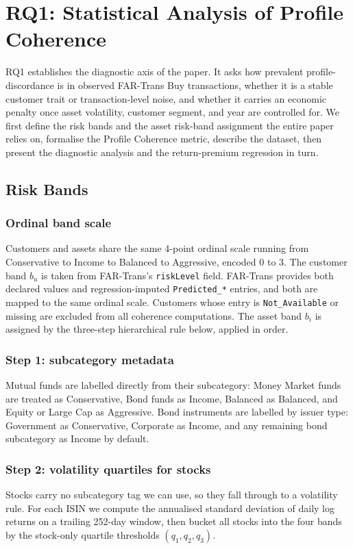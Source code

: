\section{RQ1: Statistical Analysis of Profile Coherence}
\label{sec:rq1}

RQ1 establishes the diagnostic axis of the paper. It asks how prevalent profile-discordance is in observed FAR-Trans Buy transactions, whether it is a stable customer trait or transaction-level noise, and whether it carries an economic penalty once asset volatility, customer segment, and year are controlled for. We first define the risk bands and the asset risk-band assignment the entire paper relies on, formalise the Profile Coherence metric, describe the dataset, then present the diagnostic analysis and the return-premium regression in turn.

\subsection{Risk Bands}
\label{sec:setup:bandassignment}

\subsubsection{Ordinal band scale}
Customers and assets share the same 4-point ordinal scale running from Conservative to Income to Balanced to Aggressive, encoded 0 to 3. The customer band $b_u$ is taken from FAR-Trans's \texttt{riskLevel} field. FAR-Trans provides both declared values and regression-imputed \texttt{Predicted\_*} entries, and both are mapped to the same ordinal scale. Customers whose entry is \texttt{Not\_Available} or missing are excluded from all coherence computations. The asset band $b_i$ is assigned by the three-step hierarchical rule below, applied in order.

\subsubsection{Step 1: subcategory metadata} Mutual funds are labelled directly from their subcategory: Money Market funds are treated as Conservative, Bond funds as Income, Balanced as Balanced, and Equity or Large Cap as Aggressive. Bond instruments are labelled by issuer type: Government as Conservative, Corporate as Income, and any remaining bond subcategory as Income by default.

\subsubsection{Step 2: volatility quartiles for stocks} Stocks carry no subcategory tag we can use, so they fall through to a volatility rule. For each ISIN we compute the annualised standard deviation of daily log returns on a trailing 252-day window, then bucket all stocks into the four bands by the stock-only quartile thresholds $(q_1, q_2, q_3)$.

